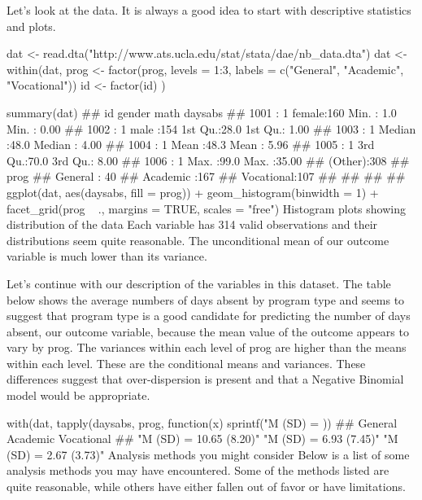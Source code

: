 \documentclass[00-GLMregression.tex]{subfiles}
\begin{document}
Let's look at the data. It is always a good idea to start with descriptive statistics and plots.

dat <- read.dta("http://www.ats.ucla.edu/stat/stata/dae/nb_data.dta")
dat <- within(dat, {
    prog <- factor(prog, levels = 1:3, labels = c("General", "Academic", "Vocational"))
    id <- factor(id)
})

summary(dat)
##        id         gender         math         daysabs     
##  1001   :  1   female:160   Min.   : 1.0   Min.   : 0.00  
##  1002   :  1   male  :154   1st Qu.:28.0   1st Qu.: 1.00  
##  1003   :  1                Median :48.0   Median : 4.00  
##  1004   :  1                Mean   :48.3   Mean   : 5.96  
##  1005   :  1                3rd Qu.:70.0   3rd Qu.: 8.00  
##  1006   :  1                Max.   :99.0   Max.   :35.00  
##  (Other):308                                              
##          prog    
##  General   : 40  
##  Academic  :167  
##  Vocational:107  
##                  
##                  
##                  
## 
ggplot(dat, aes(daysabs, fill = prog)) + geom_histogram(binwidth = 1) + facet_grid(prog ~ 
    ., margins = TRUE, scales = "free")
Histogram plots showing distribution of the data
Each variable has 314 valid observations and their distributions seem quite reasonable. The unconditional mean of our outcome variable is much lower than its variance.

Let's continue with our description of the variables in this dataset. The table below shows the average numbers of days absent by program type and seems to suggest that program type is a good candidate for predicting the number of days absent, our outcome variable, because the mean value of the outcome appears to vary by prog. The variances within each level of prog are higher than the means within each level. These are the conditional means and variances. These differences suggest that over-dispersion is present and that a Negative Binomial model would be appropriate.

with(dat, tapply(daysabs, prog, function(x) {
    sprintf("M (SD) = %
}))
##                 General                Academic              Vocational 
## "M (SD) = 10.65 (8.20)"  "M (SD) = 6.93 (7.45)"  "M (SD) = 2.67 (3.73)"
Analysis methods you might consider
Below is a list of some analysis methods you may have encountered. Some of the methods listed are quite reasonable, while others have either fallen out of favor or have limitations.
\end{document}
